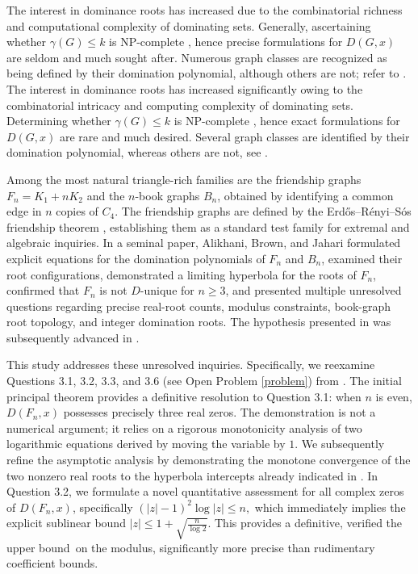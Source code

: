 \documentclass[12pt]{article}
\theoremstyle{definition}
\begin{document}
	The interest in dominance roots has increased due to the combinatorial richness and computational complexity of dominating sets. Generally, ascertaining whether $\gamma(G) \le k$ is NP-complete \cite{GareyJohnson1979}, hence precise formulations for $D(G,x)$ are seldom and much sought after. Numerous graph classes are recognized as being defined by their domination polynomial, although others are not; refer to \cite{AkbariAlikhaniPeng2010,AlikhaniPeng2011Cubic,AnthonyPicollelli2015,bilaldmlet, bilalarxiv}. The interest in dominance roots has increased significantly owing to the combinatorial intricacy and computing complexity of dominating sets. Determining whether $\gamma(G) \le k$ is NP-complete \cite{GareyJohnson1979}, hence exact formulations for $D(G,x)$ are rare and much desired. Several graph classes are identified by their domination polynomial, whereas others are not, see \cite{AkbariAlikhaniPeng2010,AlikhaniPeng2011Cubic,AnthonyPicollelli2015, bilalsc,bilaltcs,bilalac}. 
	
	Among the most natural triangle-rich families are the friendship graphs $ F_n=K_1+nK_2 $ and the $n$-book graphs $B_n$, obtained by identifying a common edge in $n$ copies of $C_4$. The friendship graphs are defined by the Erdős–Rényi–Sós friendship theorem \cite{ErdosRenyiSos1966}, establishing them as a standard test family for extremal and algebraic inquiries. In a seminal paper, Alikhani, Brown, and Jahari \cite{AlikhaniBrownJahari2016} formulated explicit equations for the domination polynomials of $F_n$ and $B_n$, examined their root configurations, demonstrated a limiting hyperbola for the roots of $F_n$, confirmed that $F_n$ is not $D$-unique for $n \ge 3$, and presented multiple unresolved questions regarding precise real-root counts, modulus constraints, book-graph root topology, and integer domination roots. The hypothesis presented in \cite{AlikhaniBrownJahari2016} was subsequently advanced in \cite{bilaljcmcc,Alikhani2013AtMinusOne,Alikhani2013NonP4}.
	
	This study addresses these unresolved inquiries. Specifically, we reexamine Questions 3.1, 3.2, 3.3, and 3.6 (see Open Problem \ref{problem}) from \cite{AlikhaniBrownJahari2016}. The initial principal theorem provides a definitive resolution to Question 3.1: when $n$ is even, $D(F_n,x)$ possesses precisely three real zeros. The demonstration is not a numerical argument; it relies on a rigorous monotonicity analysis of two logarithmic equations derived by moving the variable by $1$. We subsequently refine the asymptotic analysis by demonstrating the monotone convergence of the two nonzero real roots to the hyperbola intercepts already indicated in \cite{AlikhaniBrownJahari2016}. In Question 3.2, we formulate a novel quantitative assessment for all complex zeros of $D(F_n,x)$, specifically $ (|z|-1)^2\log |z|\le n,$ which immediately implies the explicit sublinear bound
	$|z|\le 1+\sqrt{\frac{n}{\log 2}}. $
	This provides a definitive, verified the upper bound on the modulus, significantly more precise than rudimentary coefficient bounds.
	
\end{document}
